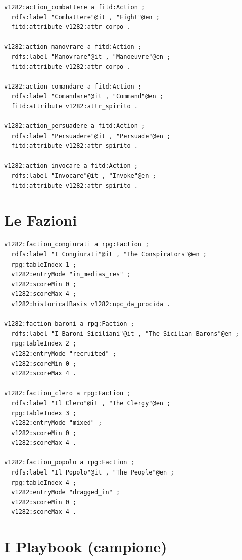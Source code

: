 \begin{verbatim}
v1282:action_combattere a fitd:Action ;
  rdfs:label "Combattere"@it , "Fight"@en ;
  fitd:attribute v1282:attr_corpo .

v1282:action_manovrare a fitd:Action ;
  rdfs:label "Manovrare"@it , "Manoeuvre"@en ;
  fitd:attribute v1282:attr_corpo .

v1282:action_comandare a fitd:Action ;
  rdfs:label "Comandare"@it , "Command"@en ;
  fitd:attribute v1282:attr_spirito .

v1282:action_persuadere a fitd:Action ;
  rdfs:label "Persuadere"@it , "Persuade"@en ;
  fitd:attribute v1282:attr_spirito .

v1282:action_invocare a fitd:Action ;
  rdfs:label "Invocare"@it , "Invoke"@en ;
  fitd:attribute v1282:attr_spirito .
\end{verbatim}

\section{Le Fazioni}

\begin{verbatim}
v1282:faction_congiurati a rpg:Faction ;
  rdfs:label "I Congiurati"@it , "The Conspirators"@en ;
  rpg:tableIndex 1 ;
  v1282:entryMode "in_medias_res" ;
  v1282:scoreMin 0 ;
  v1282:scoreMax 4 ;
  v1282:historicalBasis v1282:npc_da_procida .

v1282:faction_baroni a rpg:Faction ;
  rdfs:label "I Baroni Siciliani"@it , "The Sicilian Barons"@en ;
  rpg:tableIndex 2 ;
  v1282:entryMode "recruited" ;
  v1282:scoreMin 0 ;
  v1282:scoreMax 4 .

v1282:faction_clero a rpg:Faction ;
  rdfs:label "Il Clero"@it , "The Clergy"@en ;
  rpg:tableIndex 3 ;
  v1282:entryMode "mixed" ;
  v1282:scoreMin 0 ;
  v1282:scoreMax 4 .

v1282:faction_popolo a rpg:Faction ;
  rdfs:label "Il Popolo"@it , "The People"@en ;
  rpg:tableIndex 4 ;
  v1282:entryMode "dragged_in" ;
  v1282:scoreMin 0 ;
  v1282:scoreMax 4 .
\end{verbatim}

\section{I Playbook (campione)}

